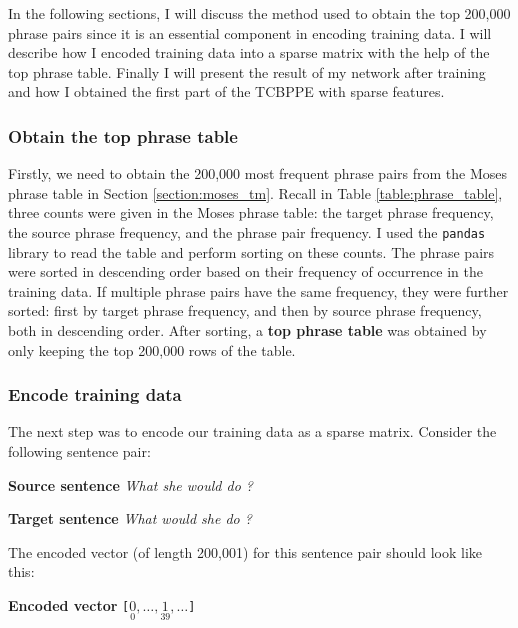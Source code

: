 \documentclass[12pt,a4paper,twoside]{report}
\begin{document}
In the following sections, I will discuss the method used to obtain the top 200,000 phrase pairs since it is an essential component in encoding training data. I will describe how I encoded training data into a sparse matrix with the help of the top phrase table. Finally I will present the result of my network after training and how I obtained the first part of the TCBPPE with sparse features.

\subsubsection{Obtain the top phrase table}
Firstly, we need to obtain the 200,000 most frequent phrase pairs from the Moses phrase table in Section \ref{section:moses_tm}. Recall in Table \ref{table:phrase_table}, three counts were given in the Moses phrase table: the target phrase frequency, the source phrase frequency, and the phrase pair frequency. I used the \texttt{pandas} library to read the table and perform sorting on these counts. The phrase pairs were sorted in descending order based on their frequency of occurrence in the training data. If multiple phrase pairs have the same frequency, they were further sorted: first by target phrase frequency, and then by source phrase frequency, both in descending order. After sorting, a \textbf{top phrase table} was obtained by only keeping the top 200,000 rows of the table.

\subsubsection{Encode training data}
The next step was to encode our training data as a sparse matrix. Consider the following sentence pair:

\hfill\begin{minipage}{\dimexpr\textwidth-0.8cm}
    \vspace*{1mm}
    \textbf{Source sentence}
    \textit{What she would do ?}

    \vspace*{1mm}

    \textbf{Target sentence}
    \textit{What would she do ?}
    \vspace*{1mm}
\end{minipage}

The encoded vector (of length 200,001) for this sentence pair should look like this:

\hfill\begin{minipage}{\dimexpr\textwidth-0.8cm}
    \vspace*{1mm}
    \textbf{Encoded vector}
    \texttt{[$\underset{0}{0}, \ldots, \underset{39}{1}, \ldots$]}
    \vspace*{1mm}
\end{minipage}
\end{document}

